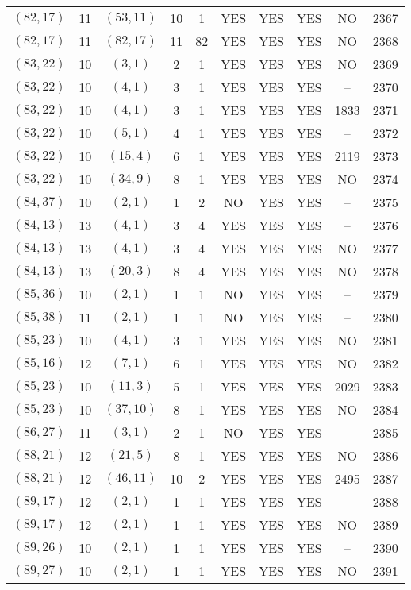 \begin{longtable}{|c|c|c|c|c|c|c|c|c|c|}
$(82, 17)$ & 11 & $(53, 11)$ & 10 & 1 & YES & YES & YES & NO & 2367\\
$(82, 17)$ & 11 & $(82, 17)$ & 11 & 82 & YES & YES & YES & NO & 2368\\
$(83, 22)$ & 10 & $(3, 1)$ & 2 & 1 & YES & YES & YES & NO & 2369\\
$(83, 22)$ & 10 & $(4, 1)$ & 3 & 1 & YES & YES & YES & -- & 2370\\
$(83, 22)$ & 10 & $(4, 1)$ & 3 & 1 & YES & YES & YES & 1833 & 2371\\
$(83, 22)$ & 10 & $(5, 1)$ & 4 & 1 & YES & YES & YES & -- & 2372\\
$(83, 22)$ & 10 & $(15, 4)$ & 6 & 1 & YES & YES & YES & 2119 & 2373\\
$(83, 22)$ & 10 & $(34, 9)$ & 8 & 1 & YES & YES & YES & NO & 2374\\
$(84, 37)$ & 10 & $(2, 1)$ & 1 & 2 & NO & YES & YES & -- & 2375\\
$(84, 13)$ & 13 & $(4, 1)$ & 3 & 4 & YES & YES & YES & -- & 2376\\
$(84, 13)$ & 13 & $(4, 1)$ & 3 & 4 & YES & YES & YES & NO & 2377\\
$(84, 13)$ & 13 & $(20, 3)$ & 8 & 4 & YES & YES & YES & NO & 2378\\
$(85, 36)$ & 10 & $(2, 1)$ & 1 & 1 & NO & YES & YES & -- & 2379\\
$(85, 38)$ & 11 & $(2, 1)$ & 1 & 1 & NO & YES & YES & -- & 2380\\
$(85, 23)$ & 10 & $(4, 1)$ & 3 & 1 & YES & YES & YES & NO & 2381\\
$(85, 16)$ & 12 & $(7, 1)$ & 6 & 1 & YES & YES & YES & NO & 2382\\
$(85, 23)$ & 10 & $(11, 3)$ & 5 & 1 & YES & YES & YES & 2029 & 2383\\
$(85, 23)$ & 10 & $(37, 10)$ & 8 & 1 & YES & YES & YES & NO & 2384\\
$(86, 27)$ & 11 & $(3, 1)$ & 2 & 1 & NO & YES & YES & -- & 2385\\
$(88, 21)$ & 12 & $(21, 5)$ & 8 & 1 & YES & YES & YES & NO & 2386\\
$(88, 21)$ & 12 & $(46, 11)$ & 10 & 2 & YES & YES & YES & 2495 & 2387\\
$(89, 17)$ & 12 & $(2, 1)$ & 1 & 1 & YES & YES & YES & -- & 2388\\
$(89, 17)$ & 12 & $(2, 1)$ & 1 & 1 & YES & YES & YES & NO & 2389\\
$(89, 26)$ & 10 & $(2, 1)$ & 1 & 1 & YES & YES & YES & -- & 2390\\
$(89, 27)$ & 10 & $(2, 1)$ & 1 & 1 & YES & YES & YES & NO & 2391\\

\end{longtable}
